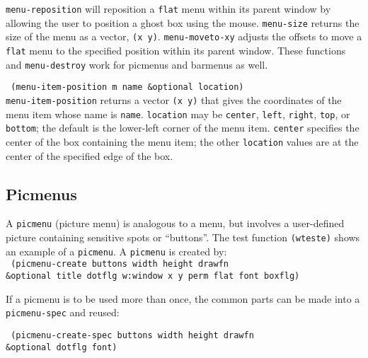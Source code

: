 {\tt menu-reposition} will reposition a {\tt flat} menu within its parent
window by allowing the user to position a ghost box using the mouse.
{\tt menu-size} returns the size of the menu as a vector, {\tt (x y)}.
{\tt menu-moveto-xy} adjusts the offsets to move a {\tt flat} menu to
the specified position within its parent window.  These functions and
{\tt menu-destroy} work for picmenus and barmenus as well.

{\tt \hspace*{0.5in} (menu-item-position m name \&optional location)} \\

\vspace{-0.1in}
{\tt menu-item-position} returns a vector {\tt (x y)} that gives the
coordinates of the menu item whose name is {\tt name}.  {\tt location}
may be {\tt center}, {\tt left}, {\tt right}, {\tt top}, or {\tt bottom};
the default is the lower-left corner of the menu item.  {\tt center}
specifies the center of the box containing the menu item; the other
{\tt location} values are at the center of the specified edge of the box.

\subsection{Picmenus}

A {\tt picmenu} (picture menu) is analogous to a menu, but involves a
user-defined picture containing sensitive spots or ``buttons''.
The test function {\tt (wteste)} shows an example of a {\tt picmenu}.
A {\tt picmenu} is created by: \\

\vspace{-0.1in}
{\tt \hspace*{0.5in} (picmenu-create buttons width height drawfn \\
\hspace*{1.5in} \&optional title dotflg w:window x y perm flat font boxflg)} \\

\vspace{-0.1in}

If a picmenu is to be used more than once, the common parts can be made
into a {\tt picmenu-spec} and reused:

\vspace{-0.1in}
{\tt \hspace*{0.5in} (picmenu-create-spec buttons width height drawfn \\
\hspace*{1.5in} \&optional dotflg font)} \\

